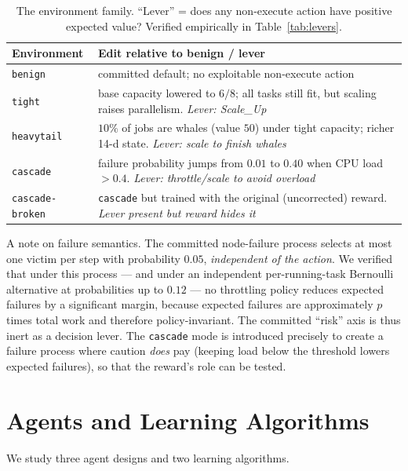 \documentclass[10pt,twocolumn]{article}
\newcommand{\env}[1]{\texttt{#1}}
\begin{document}
\begin{table}[t]
\centering
\caption{The environment family. ``Lever'' = does any non-execute action have
positive expected value? Verified empirically in Table~\ref{tab:levers}.}
\label{tab:env-family}
\small
\begin{tabularx}{\columnwidth}{@{}lY@{}}
\toprule
\textbf{Environment} & \textbf{Edit relative to benign / lever} \\
\midrule
\env{benign}        & committed default; no exploitable non-execute action \\
\env{tight}         & base capacity lowered to $6/8$; all tasks still fit, but scaling raises parallelism. \emph{Lever: Scale\_Up} \\
\env{heavytail}     & $10\%$ of jobs are whales (value $50$) under tight capacity; richer 14-d state. \emph{Lever: scale to finish whales} \\
\env{cascade}       & failure probability jumps from $0.01$ to $0.40$ when CPU load $>0.4$. \emph{Lever: throttle/scale to avoid overload} \\
\env{cascade-broken}& \env{cascade} but trained with the original (uncorrected) reward. \emph{Lever present but reward hides it} \\
\bottomrule
\end{tabularx}
\end{table}

A note on failure semantics. The committed node-failure process selects at most
one victim per step with probability $0.05$, \emph{independent of the action}.
We verified that under this process --- and under an independent
per-running-task Bernoulli alternative at probabilities up to $0.12$ --- no
throttling policy reduces expected failures by a significant margin, because
expected failures are approximately $p$ times total work and therefore
policy-invariant. The committed ``risk'' axis is thus inert as a decision lever.
The \env{cascade} mode is introduced precisely to create a failure process where
caution \emph{does} pay (keeping load below the threshold lowers expected
failures), so that the reward's role can be tested.

\section{Agents and Learning Algorithms}
\label{sec:agents}

We study three agent designs and two learning algorithms.
\end{document}
